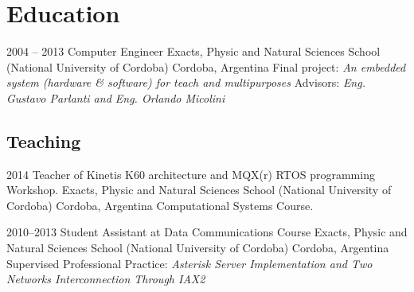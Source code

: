 
\section{Education}

\cventry
    {2004 -- 2013}
    {Computer Engineer}
    {Exacts, Physic and Natural Sciences School (National University of Cordoba)}
    {Cordoba, Argentina}
    {Final project: \emph{An embedded system (hardware \& software) for teach and multipurposes}}
    {Advisors: \emph{Eng. Gustavo Parlanti and Eng. Orlando Micolini}}

\subsection{Teaching}

\cventry
    {2014} %
    {Teacher of Kinetis K60 architecture and MQX(r) RTOS programming Workshop.}
    {Exacts, Physic and Natural Sciences School (National University of Cordoba)} %
    {Cordoba, Argentina} %
    {}
    {Computational Systems Course.}

  \cventry
    {2010--2013}
    {Student Assistant at Data Communications Course}
    {Exacts, Physic and Natural Sciences School (National University of Cordoba)} %
    {Cordoba, Argentina}
    {}
    {Supervised Professional Practice: \emph{Asterisk Server Implementation and Two Networks Interconnection Through IAX2}}

